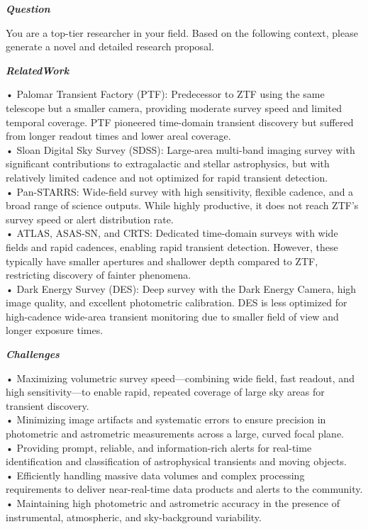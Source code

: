 \begin{tcolorbox}[
    breakable,
    title={Example of Idea Generation in Astronomy},
    colback=LighterGray,
    colframe=DeepPurple,
    colbacktitle=DeepPurple,
    coltitle=White,
]
\textbf{\emph{\textcolor{DeepPurple}{Question}}}

You are a top-tier researcher in your field. Based on the following context, please generate a novel and detailed research proposal.

\textbf{\emph{\textcolor{CaseOrange}{RelatedWork}}}

• Palomar Transient Factory (PTF): Predecessor to ZTF using the same telescope but a smaller camera, providing moderate survey speed and limited temporal coverage. PTF pioneered time-domain transient discovery but suffered from longer readout times and lower areal coverage. \\
• Sloan Digital Sky Survey (SDSS): Large-area multi-band imaging survey with significant contributions to extragalactic and stellar astrophysics, but with relatively limited cadence and not optimized for rapid transient detection. \\
• Pan-STARRS: Wide-field survey with high sensitivity, flexible cadence, and a broad range of science outputs. While highly productive, it does not reach ZTF's survey speed or alert distribution rate. \\
• ATLAS, ASAS-SN, and CRTS: Dedicated time-domain surveys with wide fields and rapid cadences, enabling rapid transient detection. However, these typically have smaller apertures and shallower depth compared to ZTF, restricting discovery of fainter phenomena. \\
• Dark Energy Survey (DES): Deep survey with the Dark Energy Camera, high image quality, and excellent photometric calibration. DES is less optimized for high-cadence wide-area transient monitoring due to smaller field of view and longer exposure times. 

\textbf{\emph{\textcolor{CaseOrange}{Challenges}}}

• Maximizing volumetric survey speed—combining wide field, fast readout, and high sensitivity—to enable rapid, repeated coverage of large sky areas for transient discovery. \\
• Minimizing image artifacts and systematic errors to ensure precision in photometric and astrometric measurements across a large, curved focal plane. \\
• Providing prompt, reliable, and information-rich alerts for real-time identification and classification of astrophysical transients and moving objects. \\
• Efficiently handling massive data volumes and complex processing requirements to deliver near-real-time data products and alerts to the community. \\
• Maintaining high photometric and astrometric accuracy in the presence of instrumental, atmospheric, and sky-background variability. 


\end{tcolorbox}
